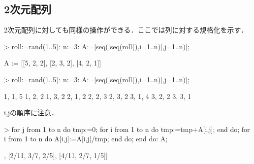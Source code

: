 \subsection{2次元配列}
2次元配列に対しても同様の操作ができる．ここでは列に対する規格化を示す．
\begin{MapleInput}
> roll:=rand(1..5):
  n:=3:
  A:=[seq([seq(roll(),i=1..n)],j=1..n)];
\end{MapleInput}
\begin{MapleError}
                     A := [[5, 2, 2], [2, 3, 2], [4, 2, 1]]
\end{MapleError}
\begin{MapleInput}
> roll:=rand(1..5):
  n:=3:
  A:=[seq([seq(roll(),i=1..n)],j=1..n)];
\end{MapleInput}
\begin{MapleError}
                            1, 1, 5
                            1, 2, 2
                            1, 3, 2
                            2, 1, 2
                            2, 2, 3
                            2, 3, 2
                            3, 1, 4
                            3, 2, 2
                            3, 3, 1
\end{MapleError}
i,jの順序に注意．
\begin{MapleInput}
> for j from 1 to n do
    tmp:=0;
    for i from 1 to n do
      tmp:=tmp+A[i,j];
    end do;
    for i from 1 to n do
      A[i,j]:=A[i,j]/tmp;
    end do;
  end do:
  A;
\end{MapleInput}
\begin{MapleError}
         [[5/11, 2/7, 2/5], [2/11, 3/7, 2/5], [4/11, 2/7, 1/5]]
\end{MapleError}
